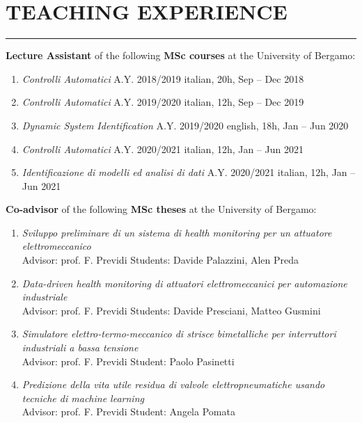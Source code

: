 \documentclass[10pt]{article}
\newcommand{\cvsection}[1]{\section*{\centering\normalsize\uppercase{#1}}\vspace{-16pt}\rule{\linewidth}{0.2pt}\vspace{6pt}}
\begin{document}

\cvsection{teaching experience}

\textbf{Lecture Assistant} of the following \textbf{MSc courses} at the University of Bergamo:
\begin{enumerate}
	\setlength\itemsep{-3pt}
	\item \textit{Controlli Automatici} A.Y. 2018/2019 \hfill italian, 20h, Sep – Dec 2018\\
	\item \textit{Controlli Automatici} A.Y. 2019/2020 \hfill italian, 12h, Sep – Dec 2019\\
	\item \textit{Dynamic System Identification} A.Y. 2019/2020 \hfill english, 18h, Jan – Jun 2020\\
	\item \textit{Controlli Automatici} A.Y. 2020/2021 \hfill italian, 12h, Jan – Jun 2021\\
	\item \textit{Identificazione di modelli ed analisi di dati} A.Y. 2020/2021 \hfill italian, 12h, Jan – Jun 2021
\end{enumerate}

\vspace{6pt} %

\textbf{Co-advisor} of the following \textbf{MSc theses} at the University of Bergamo:
\begin{enumerate}
	\setlength\itemsep{-3pt}
	\item \textit{Sviluppo preliminare di un sistema di health monitoring per un attuatore elettromeccanico}\\
	Advisor: prof. F. Previdi \hfill Students: Davide Palazzini, Alen Preda
	\item \textit{Data-driven health monitoring di attuatori elettromeccanici per automazione industriale}\\
	Advisor: prof. F. Previdi \hfill Students: Davide Presciani, Matteo Gusmini
	\item \textit{Simulatore elettro-termo-meccanico di strisce bimetalliche per interruttori industriali a bassa tensione}\\
	Advisor: prof. F. Previdi \hfill Student: Paolo Pasinetti
	\item \textit{Predizione della vita utile residua di valvole elettropneumatiche usando tecniche di machine learning}\\
	Advisor: prof. F. Previdi \hfill Student: Angela Pomata
\end{enumerate}
\end{document}
